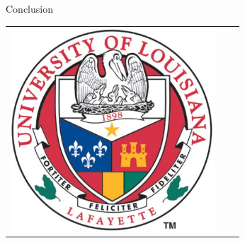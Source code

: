 \documentclass[final]{beamer}
\newlength{\sepwid}
\newlength{\onecolwid}
\begin{document}
\begin{frame}[t]
\begin{columns}[t]
\begin{column}{\onecolwid}
\begin{block}{Conclusion}
      \begin{center}
        \begin{tabular}{ccc}
          \includegraphics[width=3in, height=3in]{ulls.jpg}
        \end{tabular}
      \end{center}
    \end{block}
  \end{column}
  \begin{column}{\sepwid}\end{column}			%
 \end{columns}
\end{frame}
\end{document}
